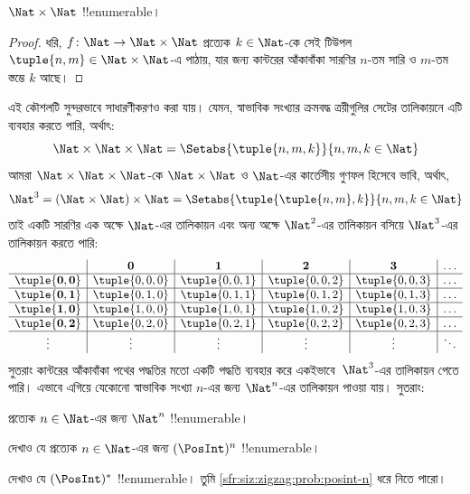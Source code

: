 \documentclass[../../../include/open-logic-section]{subfiles}
\begin{document}
\begin{prop}
$\Nat \times \Nat$ !!{enumerable}।
\end{prop}

\begin{proof}
ধরি, $f \colon \Nat \to \Nat\times\Nat$ প্রত্যেক $k \in \Nat$-কে সেই টিউপল $\tuple{n,m} \in \Nat \times \Nat$-এ পাঠায়, যার জন্য কান্টরের আঁকাবাঁকা সারণির $n$-তম সারি ও $m$-তম স্তম্ভে $k$ আছে।
\end{proof}

\begin{explain}
এই কৌশলটি সুন্দরভাবে সাধারণীকরণও করা যায়। যেমন, স্বাভাবিক সংখ্যার ক্রমবদ্ধ ত্রয়ীগুলির সেটের তালিকায়নে এটি ব্যবহার করতে পারি, অর্থাৎ:
\[
\Nat \times \Nat \times \Nat = \Setabs{\tuple{n,m,k}}{n,m,k \in \Nat}
\]
আমরা $\Nat \times \Nat \times \Nat$-কে $\Nat \times \Nat$ ও $\Nat$-এর কার্তেসীয় গুণফল হিসেবে ভাবি, অর্থাৎ,
\[
\Nat^3 = (\Nat \times \Nat) \times \Nat =
\Setabs{\tuple{\tuple{n,m},k}}{n, m, k
  \in \Nat }
\]
তাই একটি সারণির এক অক্ষে $\Nat$-এর তালিকায়ন এবং অন্য অক্ষে $\Nat^2$-এর তালিকায়ন বসিয়ে $\Nat^3$-এর তালিকায়ন করতে পারি:
\[
\begin{array}{ c | c | c | c | c | c}
& \mathbf 0 & \mathbf 1 & \mathbf 2 & \mathbf 3 & \dots \\
\hline
\mathbf{\tuple{0,0}} & \tuple{0,0,0} & \tuple{0,0,1} & \tuple{0,0,2} & \tuple{0,0,3} & \dots \\
\hline
\mathbf{\tuple{0,1}} & \tuple{0,1,0} & \tuple{0,1,1} & \tuple{0,1,2} & \tuple{0,1,3} & \dots \\
\hline
\mathbf{\tuple{1,0}} & \tuple{1,0,0} & \tuple{1,0,1} & \tuple{1,0,2} & \tuple{1,0,3} & \dots \\
\hline
\mathbf{\tuple{0,2}} & \tuple{0,2,0} & \tuple{0,2,1} & \tuple{0,2,2} & \tuple{0,2,3} & \dots\\
\hline
\vdots & \vdots & \vdots & \vdots & \vdots & \ddots \\
\end{array}
\]
সুতরাং কান্টরের আঁকাবাঁকা পথের পদ্ধতির মতো একটি পদ্ধতি ব্যবহার করে একইভাবে~$\Nat^3$-এর তালিকায়ন পেতে পারি। এভাবে এগিয়ে যেকোনো স্বাভাবিক সংখ্যা $n$-এর জন্য $\Nat^n$-এর তালিকায়ন পাওয়া যায়। সুতরাং:
\end{explain}

\begin{prop}
প্রত্যেক $n \in \Nat$-এর জন্য $\Nat^n$ !!{enumerable}।
\end{prop}

\begin{prob}\label{sfr:siz:zigzag:prob:posint-n}
দেখাও যে প্রত্যেক $n \in \Nat$-এর জন্য $(\PosInt)^n$ !!{enumerable}।
\end{prob}

\begin{prob}\label{sfr:siz:zigzag:prob:posint-star}
  দেখাও যে $(\PosInt)^*$ !!{enumerable}। তুমি \cref{sfr:siz:zigzag:prob:posint-n} ধরে নিতে পারো।
\end{prob}
\end{document}

